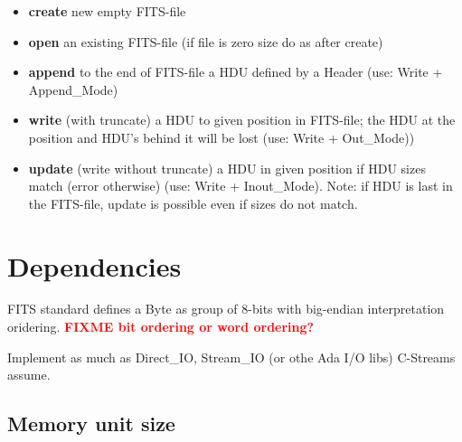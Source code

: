 \documentclass[a4paper,10pt]{article}
\newcommand{\fixme}[1]{\textbf{\textcolor{red}{FIXME #1}}}
\begin{document}
\begin{itemize}
\item \textbf{create} new empty FITS-file
\item \textbf{open} an existing FITS-file (if file is zero size do as after create)
\item \textbf{append} to the end of FITS-file a HDU defined by a Header (use: Write + Append\_Mode)
\item \textbf{write} (with truncate) a HDU to given position in 
FITS-file; the HDU at the position and HDU's behind it will be lost
(use: Write + Out\_Mode))
\item \textbf{update} (write without truncate) a HDU in given 
position if HDU sizes match (error otherwise)
(use: Write + Inout\_Mode).
Note: if HDU is last in the FITS-file, 
update is possible even if sizes do not match.
\end{itemize}


%

\section{Dependencies}

FITS standard defines a Byte as group of 8-bits with big-endian 
interpretation oridering. \fixme{bit ordering or word ordering?}

Implement as much as Direct\_IO, Stream\_IO (or othe Ada I/O libs) C-Streams assume.

\subsection{Memory unit size}
\end{document}
